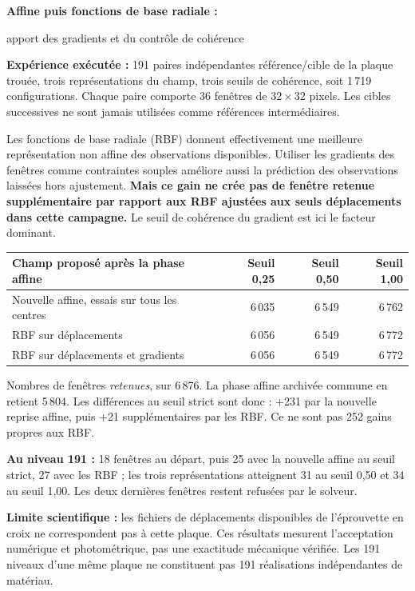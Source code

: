 \documentclass[11pt,a4paper,landscape]{article}
\begin{document}
{\LARGE\bfseries Affine puis fonctions de base radiale :\par
apport des gradients et du contrôle de cohérence\par}
\vspace{4mm}
\textbf{Expérience exécutée :} 191 paires indépendantes référence/cible de la plaque
trouée, trois représentations du champ, trois seuils de cohérence, soit 1\,719 configurations.
Chaque paire comporte 36 fenêtres de $32\times32$ pixels. Les cibles successives ne sont
jamais utilisées comme références intermédiaires.

Les fonctions de base radiale (RBF) donnent effectivement une meilleure représentation
non affine des observations disponibles. Utiliser les gradients des fenêtres comme
contraintes souples améliore aussi la prédiction des observations laissées hors ajustement.
\textbf{Mais ce gain ne crée pas de fenêtre retenue supplémentaire par rapport aux RBF
ajustées aux seuls déplacements dans cette campagne.} Le seuil de cohérence du gradient
est ici le facteur dominant.

\begin{center}\begin{tabular}{lrrr}
\toprule
Champ proposé après la phase affine & Seuil 0,25 & Seuil 0,50 & Seuil 1,00\\\midrule
Nouvelle affine, essais sur tous les centres &6\,035&6\,549&6\,762\\
RBF sur déplacements &6\,056&6\,549&6\,772\\
RBF sur déplacements et gradients &6\,056&6\,549&6\,772\\\bottomrule
\end{tabular}\end{center}
Nombres de fenêtres \emph{retenues}, sur 6\,876. La phase affine archivée commune en
retient 5\,804. Les différences au seuil strict sont donc : +231 par la nouvelle reprise
affine, puis +21 supplémentaires par les RBF. Ce ne sont pas 252 gains propres aux RBF.

\textbf{Au niveau 191 :} 18 fenêtres au départ, puis 25 avec la nouvelle affine au seuil
strict, 27 avec les RBF ; les trois représentations atteignent 31 au seuil 0,50 et 34 au
seuil 1,00. Les deux dernières fenêtres restent refusées par le solveur.

\textbf{Limite scientifique :} les fichiers de déplacements disponibles de l'éprouvette
en croix ne correspondent pas à cette plaque. Ces résultats mesurent l'acceptation
numérique et photométrique, pas une exactitude mécanique vérifiée. Les 191 niveaux
d'une même plaque ne constituent pas 191 réalisations indépendantes de matériau.
\end{document}

